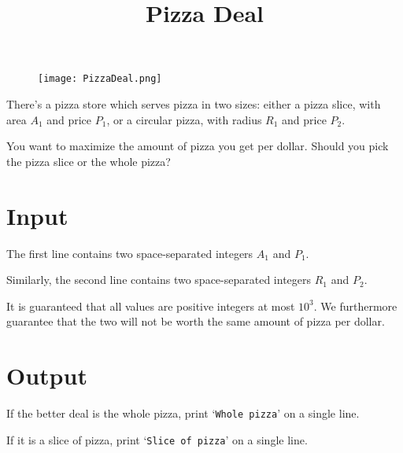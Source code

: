 \documentclass{article}
\title{Pizza Deal}
\date{}
\begin{document}
\maketitle
\begin{figure}[h!]
\centering
\texttt{[image: PizzaDeal.png]}
\end{figure}


There's a pizza store which serves pizza in two sizes:
either a pizza slice, with area $A_1$ and price $P_1$, or
a circular pizza, with radius $R_1$ and price $P_2$.

You want to maximize the amount of pizza you get per dollar. Should
you pick the pizza slice or the whole pizza?

\section{Input}

The first line contains two space-separated integers $A_1$ and $P_1$.

Similarly, the second line contains two space-separated integers $R_1$ and $P_2$.

It is guaranteed that all values are positive integers at most $10^3$.
We furthermore guarantee that the two will not be worth the same amount
of pizza per dollar.

\section{Output}

If the better deal is the whole pizza, print `\texttt{Whole pizza}' on a single
line.

If it is a slice of pizza, print `\texttt{Slice of pizza}' on a single
line.

\end{document}
